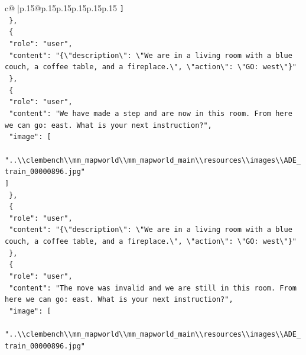 \documentclass{article}
\begin{document}
{\begin{supertabular}{c@{$\;$}|p{.15\linewidth}@{}p{.15\linewidth}p{.15\linewidth}p{.15\linewidth}p{.15\linewidth}p{.15\linewidth}}
{{{\texttt{    {]}} \\
\texttt{  \},} \\
\texttt{  \{} \\
\texttt{    "role": "user",} \\
\texttt{    "content": "\{\textbackslash{}"description\textbackslash{}": \textbackslash{}"We are in a living room with a blue couch, a coffee table, and a fireplace.\textbackslash{}", \textbackslash{}"action\textbackslash{}": \textbackslash{}"GO: west\textbackslash{}"\}"} \\
\texttt{  \},} \\
\texttt{  \{} \\
\texttt{    "role": "user",} \\
\texttt{    "content": "We have made a step and are now in this room. From here we can go: east. What is your next instruction?",} \\
\texttt{    "image": {[}} \\
\texttt{      "..\textbackslash{}\textbackslash{}clembench\textbackslash{}\textbackslash{}mm\_mapworld\textbackslash{}\textbackslash{}mm\_mapworld\_main\textbackslash{}\textbackslash{}resources\textbackslash{}\textbackslash{}images\textbackslash{}\textbackslash{}ADE\_train\_00000896.jpg"} \\
\texttt{    {]}} \\
\texttt{  \},} \\
\texttt{  \{} \\
\texttt{    "role": "user",} \\
\texttt{    "content": "\{\textbackslash{}"description\textbackslash{}": \textbackslash{}"We are in a living room with a blue couch, a coffee table, and a fireplace.\textbackslash{}", \textbackslash{}"action\textbackslash{}": \textbackslash{}"GO: west\textbackslash{}"\}"} \\
\texttt{  \},} \\
\texttt{  \{} \\
\texttt{    "role": "user",} \\
\texttt{    "content": "The move was invalid and we are still in this room. From here we can go: east. What is your next instruction?",} \\
\texttt{    "image": {[}} \\
\texttt{      "..\textbackslash{}\textbackslash{}clembench\textbackslash{}\textbackslash{}mm\_mapworld\textbackslash{}\textbackslash{}mm\_mapworld\_main\textbackslash{}\textbackslash{}resources\textbackslash{}\textbackslash{}images\textbackslash{}\textbackslash{}ADE\_train\_00000896.jpg"} \\
}}}
\end{supertabular}}
\end{document}
